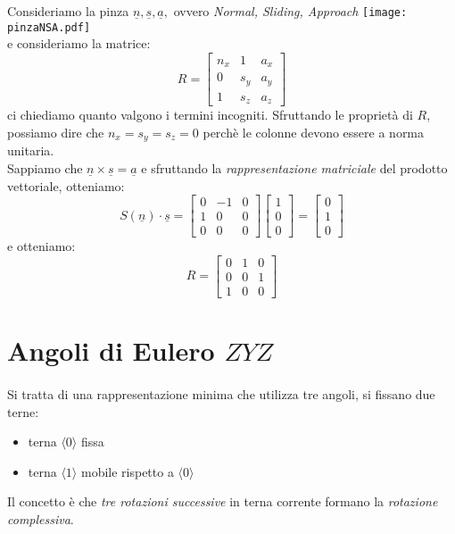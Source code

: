 \begin{Esercizio}
	Consideriamo la pinza $\underline{n},\underline{s},\underline{a},$ ovvero \emph{Normal, Sliding, Approach}
	\texttt{[image: pinzaNSA.pdf]}\\
	e consideriamo la matrice:
	\begin{equation*}
		R = 
		\begin{bmatrix}
			n_x & 1 & a_x \\
			0 & s_y & a_y \\
			1 & s_z & a_z
		\end{bmatrix}
	\end{equation*}
	ci chiediamo quanto valgono i termini incogniti. Sfruttando le proprietà di $R$, possiamo dire che $n_x = s_y = s_z = 0$ perchè le colonne devono essere a norma unitaria.\\
	Sappiamo che $\underline{n} \times \underline{s} = \underline{a}$ e sfruttando la \emph{rappresentazione matriciale} del prodotto vettoriale, otteniamo:
	\begin{equation*}
		S(\underline{n})\cdot\underline{s} = 
		\begin{bmatrix}
			0 & -1 & 0 \\
			1 & 0 & 0 \\
			0 & 0 & 0 
		\end{bmatrix}
		\begin{bmatrix}
			1 \\
			0 \\
			0
		\end{bmatrix}
		= 
		\begin{bmatrix}
			0 \\
			1 \\
			0
		\end{bmatrix}
	\end{equation*}
	e otteniamo:
	\begin{equation*}
		R = 
		\begin{bmatrix}
			0 & 1 & 0 \\
			0 & 0 & 1 \\
			1 & 0 & 0 
		\end{bmatrix}
	\end{equation*}
\end{Esercizio}


\newpage
\section{Angoli di Eulero $ZYZ$}
\paragraph{}
Si tratta di una rappresentazione minima che utilizza tre angoli, si fissano due terne: 
\begin{itemize}
	\item terna $\langle0\rangle$ fissa
	\item terna $\langle1\rangle$ mobile rispetto a $\langle0\rangle$
\end{itemize}
Il concetto è che \emph{tre rotazioni successive} in terna corrente formano la \emph{rotazione complessiva}. 
